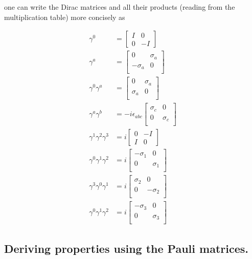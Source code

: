 one can write the Dirac matrices and all their products (reading from the multiplication table) more concisely as

\begin{align}
\gamma^0 &= 
\begin{bmatrix}
I & 0 \\
0 & -I
\end{bmatrix} \\
\gamma^a &= 
\begin{bmatrix}
0 & \sigma_a \\
-\sigma_a & 0 \\
\end{bmatrix} \\
\gamma^0 \gamma^a &=
\begin{bmatrix}
0 & \sigma_a \\
\sigma_a & 0 \\
\end{bmatrix} \\
\gamma^a \gamma^b &=
- i \epsilon_{a b c}
\begin{bmatrix}
\sigma_c & 0 \\
0 & \sigma_c \\
\end{bmatrix} \\
\gamma^1 \gamma^2 \gamma^3 &= i 
\begin{bmatrix}
0 & -I \\
I & 0
\end{bmatrix} \\
\gamma^0 \gamma^1 \gamma^2 &= i 
\begin{bmatrix}
-\sigma_1 & 0 \\
0 & \sigma_1 \\
\end{bmatrix} \\
\gamma^3 \gamma^0 \gamma^1 &= i 
\begin{bmatrix}
\sigma_2 & 0 \\
0 & -\sigma_2 \\
\end{bmatrix} \\
\gamma^0 \gamma^1 \gamma^2 &= i 
\begin{bmatrix}
-\sigma_3 & 0 \\
0 & \sigma_3 \\
\end{bmatrix}
\end{align}

\subsection{Deriving properties using the Pauli matrices. }

